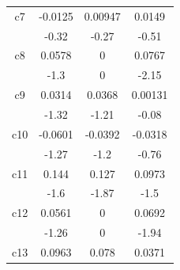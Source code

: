 \begin{table}[H]
\begin{tabular}{cccc}
        \multicolumn{1}{p{6.93em}}{c7}  & -0.0125                               & 0.00947                             & 0.0149                               \\
                                        & -0.32                                 & -0.27                               & -0.51                                \\
        \multicolumn{1}{p{6.93em}}{c8}  & 0.0578                                & 0                                   & 0.0767                               \\
                                        & -1.3                                  & 0                                   & -2.15                                \\
        \multicolumn{1}{p{6.93em}}{c9}  & 0.0314                                & 0.0368                              & 0.00131                              \\
                                        & -1.32                                 & -1.21                               & -0.08                                \\
        \multicolumn{1}{p{6.93em}}{c10} & -0.0601                               & -0.0392                             & -0.0318                              \\
                                        & -1.27                                 & -1.2                                & -0.76                                \\
        \multicolumn{1}{p{6.93em}}{c11} & 0.144                                 & 0.127                               & 0.0973                               \\
                                        & -1.6                                  & -1.87                               & -1.5                                 \\
        \multicolumn{1}{p{6.93em}}{c12} & 0.0561                                & 0                                   & 0.0692                               \\
                                        & -1.26                                 & 0                                   & -1.94                                \\
        \multicolumn{1}{p{6.93em}}{c13} & 0.0963                                & 0.078                               & 0.0371                               \\

\end{tabular}
\end{table}

